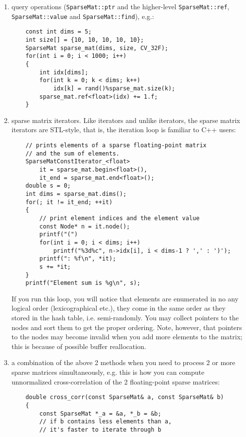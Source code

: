 \begin{enumerate}
    \item query operations (\texttt{SparseMat::ptr} and the higher-level \texttt{SparseMat::ref}, \texttt{SparseMat::value} and \texttt{SparseMat::find}), e.g.:
    \begin{lstlisting}
    const int dims = 5;
    int size[] = {10, 10, 10, 10, 10};
    SparseMat sparse_mat(dims, size, CV_32F);
    for(int i = 0; i < 1000; i++)
    {
        int idx[dims];
        for(int k = 0; k < dims; k++)
            idx[k] = rand()%sparse_mat.size(k);
        sparse_mat.ref<float>(idx) += 1.f;
    }
    \end{lstlisting}
    \item sparse matrix iterators. Like  iterators and unlike  iterators, the sparse matrix iterators are STL-style, that is, the iteration loop is familiar to C++ users:
    \begin{lstlisting}
    // prints elements of a sparse floating-point matrix
    // and the sum of elements.
    SparseMatConstIterator_<float>
        it = sparse_mat.begin<float>(),
        it_end = sparse_mat.end<float>();
    double s = 0;
    int dims = sparse_mat.dims();
    for(; it != it_end; ++it)
    {
        // print element indices and the element value
        const Node* n = it.node();
        printf("(")
        for(int i = 0; i < dims; i++)
            printf("%3d%c", n->idx[i], i < dims-1 ? ',' : ')');
        printf(": %f\n", *it);    
        s += *it;
    }
    printf("Element sum is %g\n", s);
    \end{lstlisting}
    If you run this loop, you will notice that elements are enumerated in no any logical order (lexicographical etc.), they come in the same order as they stored in the hash table, i.e. semi-randomly. You may collect pointers to the nodes and sort them to get the proper ordering. Note, however, that pointers to the nodes may become invalid when you add more elements to the matrix; this is because of possible buffer reallocation.
    \item a combination of the above 2 methods when you need to process 2 or more sparse matrices simultaneously, e.g. this is how you can compute unnormalized cross-correlation of the 2 floating-point sparse matrices:
    \begin{lstlisting}
    double cross_corr(const SparseMat& a, const SparseMat& b)
    {
        const SparseMat *_a = &a, *_b = &b;
        // if b contains less elements than a,
        // it's faster to iterate through b

\end{lstlisting}
\end{enumerate}
